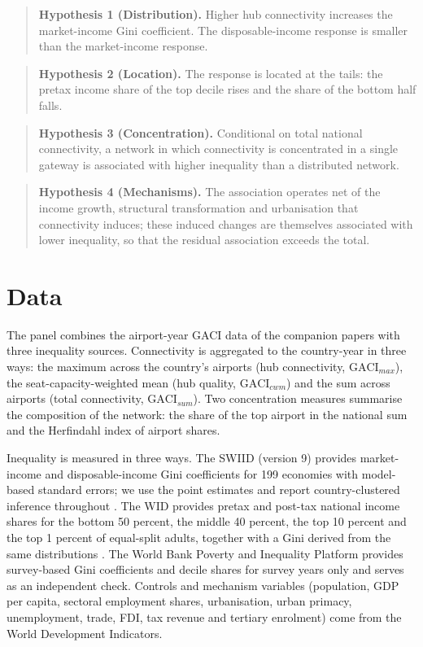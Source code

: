 \begin{quote}
\textbf{Hypothesis 1 (Distribution).} Higher hub connectivity increases the market-income Gini coefficient. The disposable-income response is smaller than the market-income response.
\end{quote}
\begin{quote}
\textbf{Hypothesis 2 (Location).} The response is located at the tails: the pretax income share of the top decile rises and the share of the bottom half falls.
\end{quote}
\begin{quote}
\textbf{Hypothesis 3 (Concentration).} Conditional on total national connectivity, a network in which connectivity is concentrated in a single gateway is associated with higher inequality than a distributed network.
\end{quote}
\begin{quote}
\textbf{Hypothesis 4 (Mechanisms).} The association operates net of the income growth, structural transformation and urbanisation that connectivity induces; these induced changes are themselves associated with lower inequality, so that the residual association exceeds the total.
\end{quote}

\section{Data}
\label{sec:data}
The panel combines the airport-year GACI data of the companion papers with three inequality sources. Connectivity is aggregated to the country-year in three ways: the maximum across the country's airports (hub connectivity, $\mathrm{GACI}_{max}$), the seat-capacity-weighted mean (hub quality, $\mathrm{GACI}_{cwm}$) and the sum across airports (total connectivity, $\mathrm{GACI}_{sum}$). Two concentration measures summarise the composition of the network: the share of the top airport in the national sum and the Herfindahl index of airport shares.

Inequality is measured in three ways. The SWIID (version 9) provides market-income and disposable-income Gini coefficients for 199 economies with model-based standard errors; we use the point estimates and report country-clustered inference throughout \citep{Solt_2020}. The WID provides pretax and post-tax national income shares for the bottom 50 percent, the middle 40 percent, the top 10 percent and the top 1 percent of equal-split adults, together with a Gini derived from the same distributions \citep{WID_2024}. The World Bank Poverty and Inequality Platform provides survey-based Gini coefficients and decile shares for survey years only and serves as an independent check. Controls and mechanism variables (population, GDP per capita, sectoral employment shares, urbanisation, urban primacy, unemployment, trade, FDI, tax revenue and tertiary enrolment) come from the World Development Indicators.

